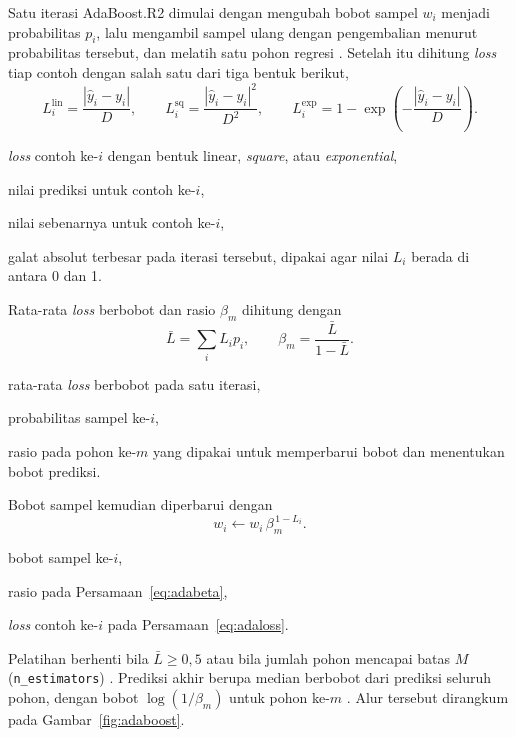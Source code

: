 Satu iterasi AdaBoost.R2 dimulai dengan mengubah bobot sampel $w_i$ menjadi
probabilitas $p_i$, lalu mengambil sampel ulang dengan pengembalian menurut
probabilitas tersebut, dan melatih satu pohon regresi \cite{drucker1997}.
Setelah itu dihitung \textit{loss} tiap contoh dengan salah satu dari tiga
bentuk berikut,
\begin{equation}
  L_i^{\text{lin}} = \frac{|\hat{y}_i - y_i|}{D}, \qquad
  L_i^{\text{sq}} = \frac{|\hat{y}_i - y_i|^2}{D^2}, \qquad
  L_i^{\text{exp}} = 1 - \exp\!\left(-\frac{|\hat{y}_i - y_i|}{D}\right).
  \label{eq:adaloss}
\end{equation}
\begin{keterangan}
  \item[$L_i$] \textit{loss} contoh ke-$i$ dengan bentuk linear,
    \textit{square}, atau \textit{exponential},
  \item[$\hat{y}_i$] nilai prediksi untuk contoh ke-$i$,
  \item[$y_i$] nilai sebenarnya untuk contoh ke-$i$,
  \item[$D$] galat absolut terbesar pada iterasi tersebut, dipakai agar nilai $L_i$ berada di antara 0 dan 1.
\end{keterangan}
Rata-rata \textit{loss} berbobot dan rasio $\beta_m$ dihitung dengan
\begin{equation}
  \bar{L} = \sum_i L_i p_i, \qquad \beta_m = \frac{\bar{L}}{1 - \bar{L}} .
  \label{eq:adabeta}
\end{equation}
\begin{keterangan}
  \item[$\bar{L}$] rata-rata \textit{loss} berbobot pada satu iterasi,
  \item[$p_i$] probabilitas sampel ke-$i$,
  \item[$\beta_m$] rasio pada pohon ke-$m$ yang dipakai untuk memperbarui bobot dan menentukan
    bobot prediksi.
\end{keterangan}
Bobot sampel kemudian diperbarui dengan
\begin{equation}
  w_i \leftarrow w_i\, \beta_m^{\,1 - L_i} .
  \label{eq:adabobot}
\end{equation}
\begin{keterangan}
  \item[$w_i$] bobot sampel ke-$i$,
  \item[$\beta_m$] rasio pada Persamaan~\eqref{eq:adabeta},
  \item[$L_i$] \textit{loss} contoh ke-$i$ pada Persamaan~\eqref{eq:adaloss}.
\end{keterangan}
Pelatihan berhenti bila $\bar{L} \ge 0{,}5$ \cite{drucker1997} atau bila
jumlah pohon mencapai batas $M$ (\texttt{n\_estimators}) \cite{sklearnadaboost}.
Prediksi akhir berupa median berbobot dari prediksi seluruh pohon, dengan bobot
$\log(1/\beta_m)$ untuk pohon ke-$m$ \cite{drucker1997}. Alur tersebut dirangkum pada
Gambar~\ref{fig:adaboost}.

